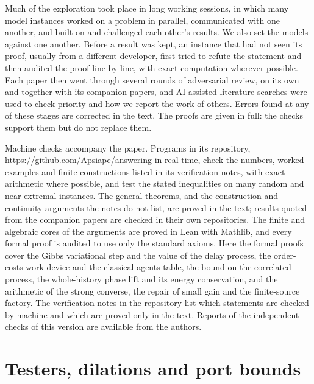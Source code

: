 \documentclass[11pt]{article}
\theoremstyle{definition}
\theoremstyle{remark}
\begin{document}
Much of the exploration took place in long working sessions, in which many model instances worked on a problem in parallel, communicated with one another, and built on and challenged each other's results. We also set the models against one another. Before a result was kept, an instance that had not seen its proof, usually from a different developer, first tried to refute the statement and then audited the proof line by line, with exact computation wherever possible. Each paper then went through several rounds of adversarial review, on its own and together with its companion papers, and AI-assisted literature searches were used to check priority and how we report the work of others. Errors found at any of these stages are corrected in the text. The proofs are given in full: the checks support them but do not replace them.

Machine checks accompany the paper. Programs in its repository, \url{https://github.com/Apsiape/answering-in-real-time}, check the numbers, worked examples and finite constructions listed in its verification notes, with exact arithmetic where possible, and test the stated inequalities on many random and near-extremal instances. The general theorems, and the construction and continuity arguments the notes do not list, are proved in the text; results quoted from the companion papers are checked in their own repositories. The finite and algebraic cores of the arguments are proved in Lean with Mathlib, and every formal proof is audited to use only the standard axioms. Here the formal proofs cover the Gibbs variational step and the value of the delay process, the order-costs-work device and the classical-agents table, the bound on the correlated process, the whole-history phase lift and its energy conservation, and the arithmetic of the strong converse, the repair of small gain and the finite-source factory. The verification notes in the repository list which statements are checked by machine and which are proved only in the text. Reports of the independent checks of this version are available from the authors.

\appendix
\section{Testers, dilations and port bounds}\label{app:testers}
\end{document}
